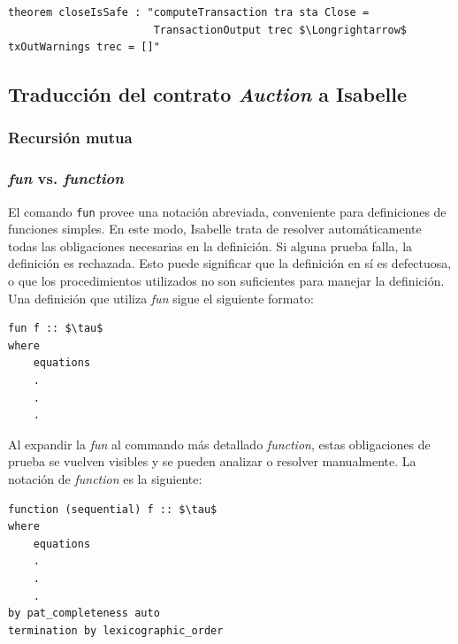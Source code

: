 \documentclass[12pt]{book}
\begin{document}
\begin{lstlisting}[style=Isabelle, caption=Ausencia de \textit{warnings} para el contrato \texttt{Close} en sintaxis de Isabelle/HOL.]
theorem closeIsSafe : "computeTransaction tra sta Close = 
                       TransactionOutput trec $\Longrightarrow$ txOutWarnings trec = []"
\end{lstlisting}

\subsection{Traducción del contrato \textit{Auction} a Isabelle}


\subsubsection{Recursión mutua}\label{sec:recursion_mutua}



\subsubsection{\textit{fun} vs. \textit{function}}

El comando \texttt{fun} provee una notación abreviada, conveniente para definiciones de funciones simples. En este modo, Isabelle trata de resolver automáticamente todas las obligaciones necesarias en la definición. Si alguna prueba falla, la definición es rechazada. Esto puede significar que la definición en sí es defectuosa, o que los procedimientos utilizados no son suficientes para manejar la definición. Una definición que utiliza \textit{fun} sigue el siguiente formato:

\begin{lstlisting}[style=Isabelle, caption=Definición de una función mediante \textit{fun}]
fun f :: $\tau$
where
    equations
    .
    .
    .
\end{lstlisting}

Al expandir la \textit{fun} al commando más detallado \textit{function}, estas obligaciones de prueba se vuelven visibles y se pueden analizar o resolver manualmente. La notación de \textit{function} es la siguiente:

\begin{lstlisting}[style=Isabelle]
function (sequential) f :: $\tau$
where
    equations
    .
    .
    .
by pat_completeness auto
termination by lexicographic_order
\end{lstlisting}
\end{document}
